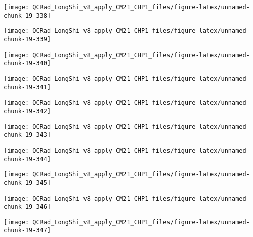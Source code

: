 \documentclass[
  10pt,
  a4paper,oneside]{article}
\begin{document}
\begin{center}\texttt{[image: QCRad\_LongShi\_v8\_apply\_CM21\_CHP1\_files/figure-latex/unnamed-chunk-19-338]} \end{center}

\begin{center}\texttt{[image: QCRad\_LongShi\_v8\_apply\_CM21\_CHP1\_files/figure-latex/unnamed-chunk-19-339]} \end{center}

\begin{center}\texttt{[image: QCRad\_LongShi\_v8\_apply\_CM21\_CHP1\_files/figure-latex/unnamed-chunk-19-340]} \end{center}

\begin{center}\texttt{[image: QCRad\_LongShi\_v8\_apply\_CM21\_CHP1\_files/figure-latex/unnamed-chunk-19-341]} \end{center}

\begin{center}\texttt{[image: QCRad\_LongShi\_v8\_apply\_CM21\_CHP1\_files/figure-latex/unnamed-chunk-19-342]} \end{center}

\begin{center}\texttt{[image: QCRad\_LongShi\_v8\_apply\_CM21\_CHP1\_files/figure-latex/unnamed-chunk-19-343]} \end{center}

\begin{center}\texttt{[image: QCRad\_LongShi\_v8\_apply\_CM21\_CHP1\_files/figure-latex/unnamed-chunk-19-344]} \end{center}

\begin{center}\texttt{[image: QCRad\_LongShi\_v8\_apply\_CM21\_CHP1\_files/figure-latex/unnamed-chunk-19-345]} \end{center}

\begin{center}\texttt{[image: QCRad\_LongShi\_v8\_apply\_CM21\_CHP1\_files/figure-latex/unnamed-chunk-19-346]} \end{center}

\begin{center}\texttt{[image: QCRad\_LongShi\_v8\_apply\_CM21\_CHP1\_files/figure-latex/unnamed-chunk-19-347]} \end{center}
\end{document}
